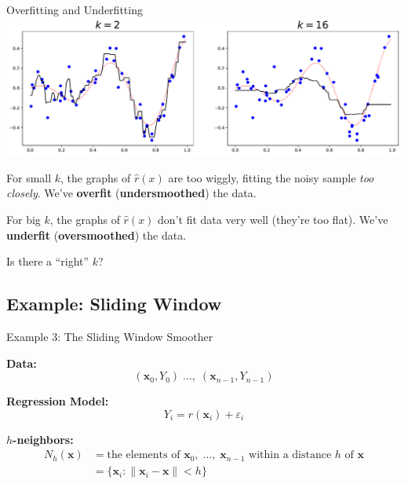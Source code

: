 \documentclass[xcolor={dvipsnames}]{beamer}
\renewcommand{\epsilon}{\varepsilon}
\renewcommand{\hat}{\widehat}
\newcommand{\vx}{\mathbf{x}}
\begin{document}
\begin{frame}{Overfitting and Underfitting}
    \setlength\parskip{1em}
    \includegraphics[scale=0.32]{knn_two_plots.pdf}

    For small $k$, the graphs of $\hat r(x)$ are too wiggly,
    fitting the noisy sample \emph{too closely}.
    We've \textbf{overfit} (\textbf{undersmoothed}) the data.


    For big $k$, the graphs of $\hat{r}(x)$ don't fit data very well (they're too flat).
    We've \textbf{underfit} (\textbf{oversmoothed}) the data.

    Is there a ``right'' $k$?
\end{frame}

\subsection{Example: Sliding Window}
\begin{frame}{Example 3: The Sliding Window Smoother}
    \setlength\parskip{0.75em}

    \textbf{Data:} $$(\vx_0,Y_0)\;\ldots,\;(\vx_{n-1}, Y_{n-1})$$
    
    \textbf{Regression Model:}
    \[
        Y_i = r(\vx_i) + \epsilon_i
    \]

    \textbf{$h$-neighbors:} 
    \begin{align*}
        N_h(\vx) &= \text{the elements of $\vx_0,\;\ldots,\;\vx_{n-1}$ within a distance $h$ of $\vx$}\\[1ex]
        &= \{\vx_i : \|\vx_i - \vx\| < h\}
    \end{align*}

\end{frame}
        
\end{document}
